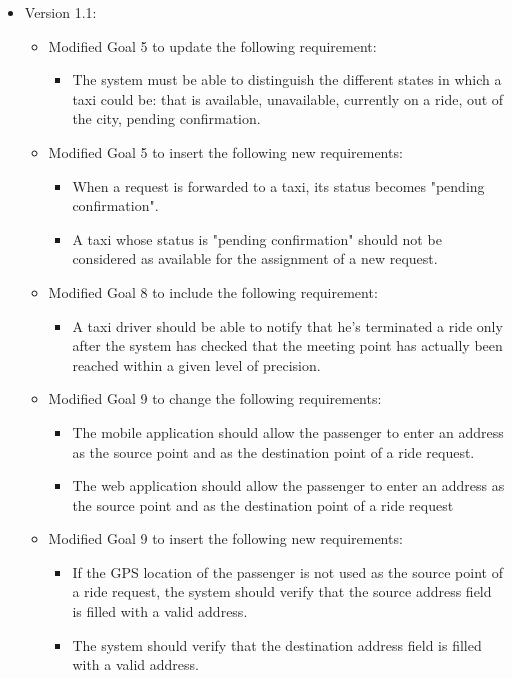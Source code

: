 \begin{itemize}
	\item Version 1.1:
	\begin{itemize}
	\item Modified Goal 5 to update the following requirement:
	\begin{itemize}
	\item The system must be able to distinguish the different states in which a taxi could be: that is available, unavailable, currently on a ride, out of the city, pending confirmation.
	\end{itemize}
	\item Modified Goal 5 to insert the following new requirements:
	\begin{itemize}
		\item When a request is forwarded to a taxi, its status becomes "pending confirmation". 
		\item A taxi whose status is "pending confirmation" should not be considered as available for the assignment of a new request.
	\end{itemize}
	\item Modified Goal 8 to include the following requirement: 
	\begin{itemize}
	\item A taxi driver should be able to notify that he's terminated a ride only after the system has checked that the meeting point has actually been reached within a given level of precision.
	\end{itemize}
	\item Modified Goal 9 to change the following requirements:
	\begin{itemize}
	\item The mobile application should allow the passenger to enter an address as the source point and as the destination point of a ride request.
	\item The web application should allow the passenger to enter an address as the source point and as the destination point of a ride request
	\end{itemize}
	\item Modified Goal 9 to insert the following new requirements:
	\begin{itemize}
	\item If the GPS location of the passenger is not used as the source point of a ride request, the system should verify that the source address field is filled with a valid address.
	\item The system should verify that the destination address field is filled with a valid address.

\end{itemize}
\end{itemize}
\end{itemize}
